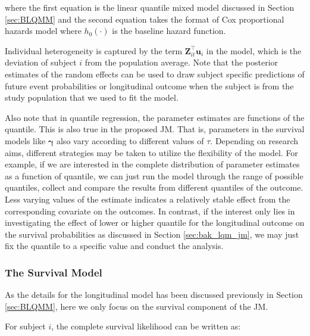 where the first equation is the linear quantile mixed model discussed in Section \ref{sec:BLQMM} and the second equation takes the format of Cox proportional hazards model where $h_0(\cdot)$ is the baseline hazard function.\par

Individual heterogeneity is captured by the term ${\boldsymbol Z}_{it}^{\top}{\boldsymbol u}_i$ in the model, which is the deviation of subject $i$ from the population average. Note that the posterior estimates of the random effects can be used to draw subject specific predictions of future event probabilities or longitudinal outcome when the subject is from the study population that we used to fit the model.\par

Also note that in quantile regression, the parameter estimates are functions of the quantile. This is also true in the proposed JM. That is, parameters in the survival models like $\boldsymbol{\gamma}$ also vary according to different values of $\tau$. Depending on research aims, different strategies may be taken to utilize the flexibility of the model. For example, if we are interested in the complete distribution of parameter estimates as a function of quantile, we can just run the model through the range of possible quantiles, collect and compare the results from different quantiles of the outcome. Less varying values of the estimate indicates a relatively stable effect from the corresponding covariate on the outcomes.  In contrast, if the interest only lies in investigating the effect of lower or higher quantile for the longitudinal outcome on the survival probabilities as discussed in Section \ref{sec:bak_lqm_jm}, we may just fix the quantile to a specific value and conduct the analysis. 



\subsubsection{The Survival Model}
As the details for the longitudinal model has been discussed previously in Section \ref{sec:BLQMM}, here we only focus on the survival component of the JM. \par

For subject $i$, the complete survival likelihood can be written as:

